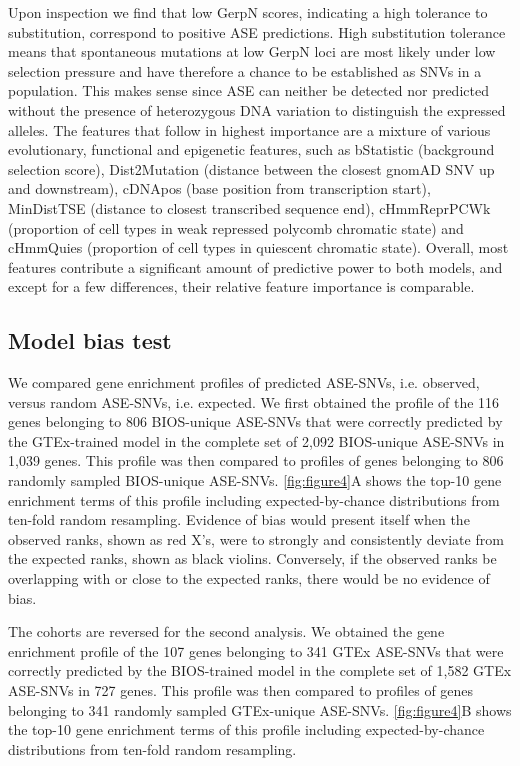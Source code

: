 \documentclass{book}
\begin{document}
\begin{refsection}
Upon inspection we find that low GerpN scores, indicating a high tolerance to substitution, correspond to positive ASE predictions.
High substitution tolerance means that spontaneous mutations at low GerpN loci are most likely under low selection pressure and have therefore a chance to be established as SNVs in a population.
This makes sense since ASE can neither be detected nor predicted without the presence of heterozygous DNA variation to distinguish the expressed alleles.
The features that follow in highest importance are a mixture of various evolutionary, functional and epigenetic features, such as bStatistic (background selection score), Dist2Mutation (distance between the closest gnomAD SNV up and downstream), cDNApos (base position from transcription start), MinDistTSE (distance to closest transcribed sequence end), cHmmReprPCWk (proportion of cell types in weak repressed polycomb chromatic state) and cHmmQuies (proportion of cell types in quiescent chromatic state).
Overall, most features contribute a significant amount of predictive power to both models, and except for a few differences, their relative feature importance is comparable.

\subsection*{Model bias test}
We compared gene enrichment profiles of predicted ASE-SNVs, i.e. observed, versus random ASE-SNVs, i.e. expected.
We first obtained the profile of the 116 genes belonging to 806 BIOS-unique ASE-SNVs that were correctly predicted by the GTEx-trained model in the complete set of 2,092 BIOS-unique ASE-SNVs in 1,039 genes.
This profile was then compared to profiles of genes belonging to 806 randomly sampled BIOS-unique ASE-SNVs.
\ref{fig:figure4}A shows the top-10 gene enrichment terms of this profile including expected-by-chance distributions from ten-fold random resampling.
Evidence of bias would present itself when the observed ranks, shown as red X's, were to strongly and consistently deviate from the expected ranks, shown as black violins.
Conversely, if the observed ranks be overlapping with or close to the expected ranks, there would be no evidence of bias.

The cohorts are reversed for the second analysis.
We obtained the gene enrichment profile of the 107 genes belonging to 341 GTEx ASE-SNVs that were correctly predicted by the BIOS-trained model in the complete set of 1,582 GTEx ASE-SNVs in 727 genes.
This profile was then compared to profiles of genes belonging to 341 randomly sampled GTEx-unique ASE-SNVs.
\ref{fig:figure4}B shows the top-10 gene enrichment terms of this profile including expected-by-chance distributions from ten-fold random resampling.


\end{refsection}
\end{document}
